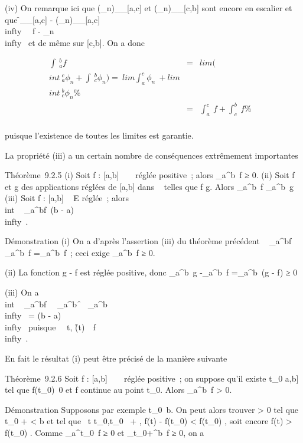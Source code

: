 \documentclass[]{article}
\begin{document}
(iv) On remarque ici que
(\phi_n)__{[}a,c{]} et
(\phi_n)__{[}c,b{]} sont encore en
escalier et que
\f__{[}a,c{]} -
(\phi_n)__{[}a,c{]}\\infty~
\leq\ f - \phi_n\\infty~
et de même sur {[}c,b{]}. On a donc

\begin{align*} \int ~
_a^bf& =&
lim(\\int ~
_a^c\phi_ n +\int ~
_c^b\phi_ n) =\
lim\int  _a^c\phi_ n~
+ lim\\int ~
_c^b\phi_ n\%& \\ &
=& \int  _a^c~f
+\int  _c^b~f \%&
\\ \end{align*}

puisque l'existence de toutes les limites est garantie.

La propriété (iii) a un certain nombre de conséquences extrêmement
importantes

Théorème~9.2.5 (i) Soit f : {[}a,b{]} \rightarrow~ ~ réglée positive~; alors
\int  _a^b~f ≥ 0. (ii) Soit f et g
des applications réglées de {[}a,b{]} dans ~ telles que f \leq g. Alors
\int  _a^b~f
\leq\int  _a^b~g (iii) Soit f :
{[}a,b{]} \rightarrow~ E réglée~; alors
\\int ~
_a^bf\ \leq (b -
a)\f\\infty~.

Démonstration (i) On a d'après l'assertion (iii) du théorème précédent
\left \int ~
_a^bf\right 
\leq\int  _a^b~f
=\int  _a^b~f~; ceci exige
\int  _a^b~f ≥ 0.

(ii) La fonction g - f est réglée positive, donc
\int  _a^b~g
-\int  _a^b~f
=\int  _a^b~(g - f) ≥ 0

(iii) On a \\int ~
_a^bf\
\leq\int ~
_a^b\f\
\leq\int ~
_a^b\f\\infty~
= (b - a)\f\\infty~ puisque
\forall~~t,
\f(t)\
\leq\ f\\infty~.

En fait le résultat (i) peut être précisé de la manière suivante

Théorème~9.2.6 Soit f : {[}a,b{]} \rightarrow~ ~ réglée positive~; on suppose qu'il
existe t_0 \in {[}a,b{]} tel que
f(t_0)\neq~0 et f continue au point
t_0. Alors \int  _a^b~f
\textgreater{} 0.

Démonstration Supposons par exemple
t_0\neq~b. On peut alors trouver \eta
\textgreater{} 0 tel que t_0 + \eta \textless{} b et tel que
\forall~t \in {[}t_0,t_0~ + \eta{]},
f(t) - f(t_0) \textless{} f(t_0)
\over 2 , soit encore f(t) \textgreater{}
f(t_0) \over 2 . Comme
\int  _a^t_0~f ≥ 0 et
\int  _t_0+\eta^b~f ≥ 0, on
a
\end{document}
